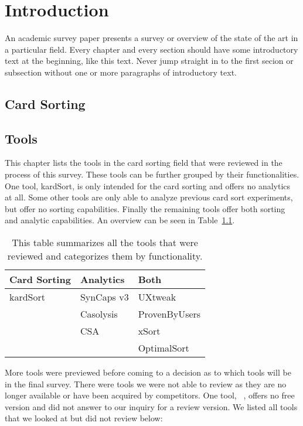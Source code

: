 \chapter{Introduction}

\label{chap:Intro}


An academic survey paper presents a survey or overview of the state of
the art in a particular field. Every chapter and every section should
have some introductory text at the beginning, like this text. Never
jump straight in to the first secion or subsection without one or more
paragraphs of introductory text.






\section{Card Sorting}

\section{Tools} This chapter lists the tools in the card sorting field
that were reviewed in the process of this survey. These tools can be
further grouped by their functionalities. One tool, kardSort, is only
intended for the card sorting and offers no analytics at all. Some
other tools are only able to analyze previous card sort experiments,
but offer no sorting capabilities. Finally the remaining tools offer
both sorting and analytic capabilities. An overview can be seen in
Table~\ref{tab:reviewed-tools}.

\begin{table}[bp]
\centering
\begin{tabularx}
{\linewidth}{|X|X|X|}
\hline \textbf{Card Sorting} & \textbf{Analytics} & \textbf{Both}\\ 
\hline kardSort & SynCaps v3 & UXtweak \\ 
\hline & Casolysis & ProvenByUsers \\
\hline & CSA & xSort \\
\hline & & OptimalSort \\
\hline
\end{tabularx} 
\caption[Reviewed Tools] 
{ 
This table summarizes all the tools that were reviewed and categorizes
them by functionality.
}
\label{tab:reviewed-tools}
\end{table}

More tools were previewed before coming to a decision as to which
tools will be in the final survey. There were tools we were not able
to review as they are no longer available or have been acquired by
competitors. One tool, ~\textcite{UserZoom}, offers no free version
and did not answer to our inquiry for a review version. We listed all
tools that we looked at but did not review below:

